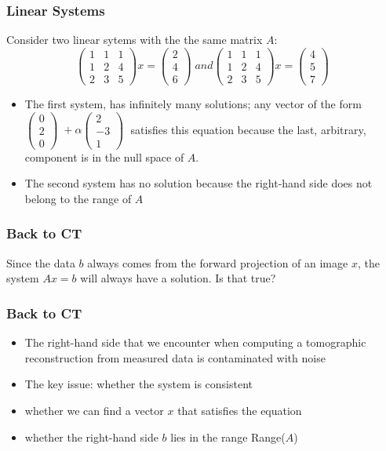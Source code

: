 \documentclass{beamer}
\begin{document}
\begin{frame}
	\frametitle{Linear Systems}
Consider two linear sytems with the the same matrix $A$: 
	$$ \begin{pmatrix} 1 & 1 & 1 \\ 1 & 2 & 4 \\ 2 & 3 & 5 \end{pmatrix}x = \begin{pmatrix} 2\\ 4 \\ 6 \end{pmatrix} \; 
		and \begin{pmatrix} 1 & 1 & 1 \\ 1 & 2 & 4 \\ 2 & 3 & 5 \end{pmatrix}x = \begin{pmatrix} 4\\ 5 \\ 7 \end{pmatrix} \;  $$
	\begin{itemize}
		 \pause
		\item The first system, has infinitely many solutions; any vector of the form $\begin{pmatrix} 0\\ 2 \\ 0 \end{pmatrix} \; +\alpha \begin{pmatrix} 2\\ -3 \\ 1 \end{pmatrix} \; $ satisfies this equation because the last, arbitrary, component is in the null space of $A$.
		 \pause
			\item The second system has no solution because the right-hand side does not belong to the range of $A$
		
	\end{itemize}		
\end{frame}
\begin{frame}
	\frametitle{Back to CT}
	\center 
Since the data $b$ always comes from the forward projection of an image $x$, the system $Ax= b$ will always have a solution. 
\newline
\center
		 \pause
Is that true?
\end{frame}

\begin{frame}
	\frametitle{Back to CT}
         \begin{itemize}
		 \item The right-hand side that we encounter when computing a tomographic reconstruction from measured data is contaminated with noise
		 \pause
		 \item The key issue: whether the system is consistent 
		 \item whether we can find a vector $x$ that satisfies the equation 
		 \item whether the right-hand side $b$ lies in the range Range($A$)
	 \end{itemize}
\end{frame}
\end{document}
